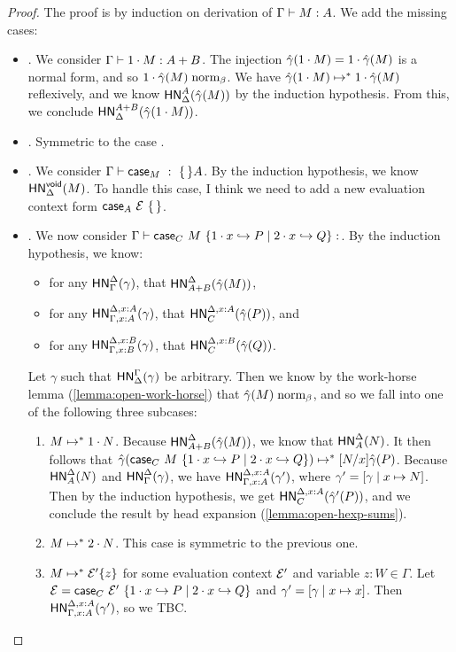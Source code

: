 \documentclass{article}
\begin{document}
\begin{proof}
  The proof is by induction on derivation of $\Gamma \vdash M : A$.
  We add the missing cases:
  \begin{itemize}
  \item {}. We consider $\Gamma \vdash 1\cdot M : A + B$.
    The injection $\hat\gamma(1\cdot M) = 1\cdot\hat\gamma(M)$ is a normal form, and so $1\cdot\hat\gamma(M) \mathrel{\text{norm}_\beta}$.
    We have $\hat\gamma(1\cdot M) \mapsto^* 1\cdot\hat\gamma(M)$ reflexively, and we know $\mathsf{HN}^{A}_{\Delta}(\hat\gamma(M))$ by the induction hypothesis.
    From this, we conclude $\mathsf{HN}^{A + B}_{\Delta}(\hat\gamma({1\cdot M}))$.
  \item {}. Symmetric to the case .
  \item {}. We consider $\Gamma \vdash \mathsf{case}_{M}\ :\ \{\,\} A$.
    By the induction hypothesis, we know $\mathsf{HN}^{\mathsf{void}}_{\Delta}(M)$.
    To handle this case, I think we need to add a new evaluation context form $\mathsf{case}_{A}\ \mathcal{E}\ \{\,\}$.
  \item {}. We now consider $\hasEF{\Gamma}{\scase{C}{M}{x}{P}{Q}}$.
    By the induction hypothesis, we know:
    \begin{itemize}
    \item for any $\mathsf{HN}^{\Delta}_{\Gamma}(\gamma)$, that $\mathsf{HN}^{\Delta}_{A+B}(\hat\gamma(M))$,
    \item for any $\mathsf{HN}^{\Delta,x:A}_{\Gamma,x:A}(\gamma)$, that $\mathsf{HN}^{\Delta,x:A}_{C}(\hat\gamma(P))$, and
    \item for any $\mathsf{HN}^{\Delta,x:B}_{\Gamma,x:B}(\gamma)$, that $\mathsf{HN}^{\Delta,x:B}_{C}(\hat\gamma(Q))$.
    \end{itemize}
    Let $\gamma$ such that $\mathsf{HN}^{\Gamma}_{\Delta}(\gamma)$ be arbitrary.
    Then we know by the work-horse lemma (\cref{lemma:open-work-horse}) that $\hat\gamma(M) \mathrel{\text{norm}_\beta}$, and so we fall into one of the following three subcases:
    \begin{enumerate}
    \item $M \mapsto^* 1\cdot N$. Because $\mathsf{HN}^{\Delta}_{A+B}(\hat\gamma(M))$, we know that $\mathsf{HN}^{\Delta}_{A}(N)$.
      It then follows that $\hat\gamma(\mathsf{case}_{C}\ M\ \{1\cdot x \hookrightarrow P \mid 2\cdot x \hookrightarrow Q\}) \mapsto^* [N/x]\hat\gamma(P)$.
      Because $\mathsf{HN}^{\Delta}_{A}(N)$ and $\mathsf{HN}^{\Delta}_{\Gamma}(\gamma)$, we have $\mathsf{HN}^{\Delta,x:A}_{\Gamma,x:A}(\gamma')$, where $\gamma' = [\gamma \mid x \mapsto N]$.
      Then by the induction hypothesis, we get $\mathsf{HN}^{\Delta,x:A}_{C}(\hat\gamma'(P))$, and we conclude the result by head expansion (\cref{lemma:open-hexp-sums}).
    \item $M \mapsto^* 2\cdot N$. This case is symmetric to the previous one.
    \item $M \mapsto^* \mathcal{E}'\{z\}$ for some evaluation context $\mathcal{E}'$ and variable $z:W \in \Gamma$.
      Let $\mathcal{E} = \mathsf{case}_{C}\ \mathcal{E}'\ \{1\cdot x \hookrightarrow P \mid 2\cdot x \hookrightarrow Q\}$ and $\gamma' = [\gamma \mid x \mapsto x]$.
      Then $\mathsf{HN}^{\Delta,x:A}_{\Gamma,x:A}(\gamma')$, so we TBC.
    \end{enumerate}
  \end{itemize}
\end{proof}



\end{document}
